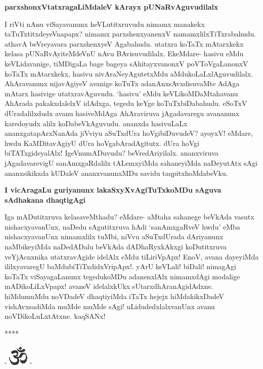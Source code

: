 {\bigskip
\noindent
{\large\bf parxshonxVtatxragaLiMdaleV kArayx pUNaRvAguvudilalx}}\label{page213b}
\medskip

\noindent
I riVti nAnu viSayavanunx heVLutitxruvudu nimamx manakekx taTuTxtitxdeyeVnapapx? \hbox{nimamx} parxshenxyanenxV namamxlilxTiTxrabahudu. athavA beVreyavara parxshenxyeV Agabahudu. utatxra koTaTx mAtarxkekx kelasa pUNaRvAyiteMdeVnU nAvu BAvisuvudilalx. EkeMdare- hasivu eMdu keVLidavanige, tiMDigaLa bage bageya sAhitayxvanonxV poVToVgaLanonxV koTaTx mAtarxkekx, hasivu nivAraNeyAgutetxMdu aMdukoLaLxlAguvudilalx. AhAravanunx nijavAgiyeV avanige koTuTx adanAnxsAvxdisuvaMte AdAga mAtarx hasivige utatxravAguvudu. `hasivu' eMdu keVLikoMDaMtahavanu AhArada pakakxdalelxV idAdxga, tegedu keYge koTuTxbiDabahudu. eSoTxV dUradalilxdudx avanu hasiveMdAga AhAraviruva jAgadavaregu avananunx karedoyudx alilx koDabeVkAguvudu. ananxda hasivuLaLx ananxgatapArxNanAda jiVviyu aSuTxdUra hoVgibiDuvudeV? ayoyxV! eMdare, hwdu KaMDitavAgiyU dUra hoVgabAradAgitutx. dUra hoVgi biTATxgideyalAlx! IgeVnumADuvudu? beVredAriyilalx. ananxviruva jAgadavarevigU sanAmxgaRdalilx tALemxyiMda sahaneyiMda naDeyutAtx sAgi ananxsikikxda kUDaleV ananxvanunxMDu savidu taqpitxhoMdabeVku.

{\bigskip
\noindent
{\large\bf I vicAragaLu guriyanunx lakaSxyXvAgiTuTxkoMDu sAguva sAdhakana dhaqtigAgi}}\label{page218}
\medskip

\noindent
Iga mADutitxruva kelasaveMthadu? eMdare- aMtaha sahanege beVkAda vasutx nishacxyavanUnx, naDedu sAgutitxruva hAdi `sanAmxgaRveV hwdu' eMba nishacxyavanUnx nimamxlilx tuMbi, niVvu aSuTxdUrada dAriyanunx naMbikeyiMda naDedADalu beVkAda dADhaRyxkAkxgi koDutitxruva veYjAcnxnika utatxravAgide idelAlx eMdu tiLiriVpApx! EnoV, avana dayeyiMda ililxyavaregU baMdubiTiTxdidxVripApx!. yArU keVLali! biDali! nimagAgi koTaTx viSayagaLanunx tegedukoMDu adanenxlAlx nimamxdAgi modalige mADikoLiLxVpapx! avaneV idelalxkUkx sUtarxdhAranAgidAdxne. hiMdumuMdu noVDadeV dhaqtiyiMda iTaTx hejejx hiMdakikxDadeV vishAvxsadiMda muMde muMde sAgi! uLidudedxlalxvanUnx avanu noVDikoLuLxtAtxne. kaqSANx!

\medskip

\begin{center}
****
\end{center}

\newpage

\begin{center}
- \includegraphics{om.eps} -
\end{center}


